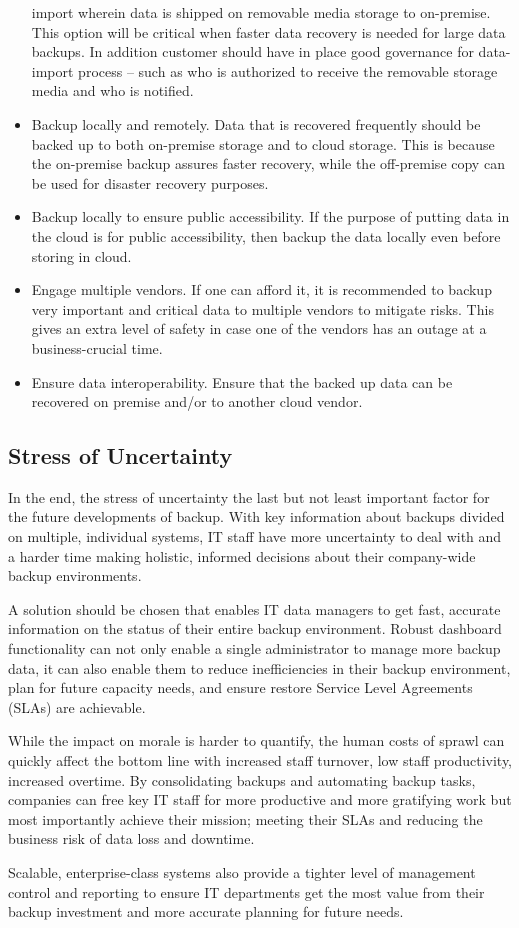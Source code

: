 \begin{itemize}
		import wherein data is shipped on removable media storage to
		on-premise. This option will be critical when faster data
		recovery is needed for large data backups. In addition customer
		should have in place good governance for data-import process --
		such as who is authorized to receive the removable storage media
		and who is notified.
	\item Backup locally and remotely. Data that is recovered frequently
		should be backed up to both on-premise storage and to cloud
		storage. This is because the on-premise backup assures faster
		recovery, while the off-premise copy can be used for disaster
		recovery purposes.
	\item Backup locally to ensure public accessibility. If the purpose
		of putting data in the cloud is for public accessibility, then
		backup the data locally even before storing in cloud.
	\item Engage multiple vendors. If one can afford it, it is
		recommended to backup very important and critical data to
		multiple vendors to mitigate risks. This gives an extra level of
		safety in case one of the vendors has an outage at a
		business-crucial time.
	\item Ensure data interoperability. Ensure that the backed up data
		can be recovered on premise and/or to another cloud vendor.
\end{itemize}


\subsection{Stress of Uncertainty}

In the end, the stress of uncertainty the last but not least important
factor for the future developments of backup. With key information about
backups divided on multiple, individual systems, IT staff have more
uncertainty to deal with and a harder time making holistic, informed
decisions about their company-wide backup environments.

A solution should be chosen that enables IT data managers to get fast,
accurate information on the status of their entire backup environment.
Robust dashboard functionality can not only enable a single
administrator to manage more backup data, it can also enable them to
reduce inefficiencies in their backup environment, plan for future
capacity needs, and ensure restore Service Level Agreements (SLAs) are
achievable.

While the impact on morale is harder to quantify, the human costs of
sprawl can quickly affect the bottom line with increased staff turnover,
low staff productivity, increased overtime. By consolidating backups and
automating backup tasks, companies can free key IT staff for more
productive and more gratifying work but most importantly achieve their
mission; meeting their SLAs and reducing the business risk of data loss
and downtime.

Scalable, enterprise-class systems also provide a tighter level of
management control and reporting to ensure IT departments get the most
value from their backup investment and more accurate planning for future
needs.
